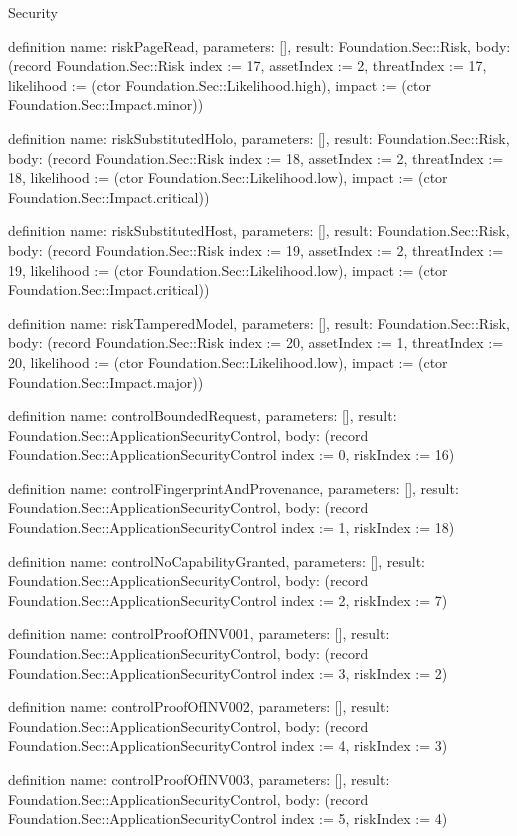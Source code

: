 \begin{lexlean}{Security}
\begin{semanticmodule}
definition{
  name: riskPageRead,
  parameters: [],
  result: Foundation.Sec::Risk,
  body: (record Foundation.Sec::Risk {index := 17, assetIndex := 2, threatIndex := 17, likelihood := (ctor Foundation.Sec::Likelihood.high), impact := (ctor Foundation.Sec::Impact.minor)})
}

definition{
  name: riskSubstitutedHolo,
  parameters: [],
  result: Foundation.Sec::Risk,
  body: (record Foundation.Sec::Risk {index := 18, assetIndex := 2, threatIndex := 18, likelihood := (ctor Foundation.Sec::Likelihood.low), impact := (ctor Foundation.Sec::Impact.critical)})
}

definition{
  name: riskSubstitutedHost,
  parameters: [],
  result: Foundation.Sec::Risk,
  body: (record Foundation.Sec::Risk {index := 19, assetIndex := 2, threatIndex := 19, likelihood := (ctor Foundation.Sec::Likelihood.low), impact := (ctor Foundation.Sec::Impact.critical)})
}

definition{
  name: riskTamperedModel,
  parameters: [],
  result: Foundation.Sec::Risk,
  body: (record Foundation.Sec::Risk {index := 20, assetIndex := 1, threatIndex := 20, likelihood := (ctor Foundation.Sec::Likelihood.low), impact := (ctor Foundation.Sec::Impact.major)})
}

definition{
  name: controlBoundedRequest,
  parameters: [],
  result: Foundation.Sec::ApplicationSecurityControl,
  body: (record Foundation.Sec::ApplicationSecurityControl {index := 0, riskIndex := 16})
}

definition{
  name: controlFingerprintAndProvenance,
  parameters: [],
  result: Foundation.Sec::ApplicationSecurityControl,
  body: (record Foundation.Sec::ApplicationSecurityControl {index := 1, riskIndex := 18})
}

definition{
  name: controlNoCapabilityGranted,
  parameters: [],
  result: Foundation.Sec::ApplicationSecurityControl,
  body: (record Foundation.Sec::ApplicationSecurityControl {index := 2, riskIndex := 7})
}

definition{
  name: controlProofOfINV001,
  parameters: [],
  result: Foundation.Sec::ApplicationSecurityControl,
  body: (record Foundation.Sec::ApplicationSecurityControl {index := 3, riskIndex := 2})
}

definition{
  name: controlProofOfINV002,
  parameters: [],
  result: Foundation.Sec::ApplicationSecurityControl,
  body: (record Foundation.Sec::ApplicationSecurityControl {index := 4, riskIndex := 3})
}

definition{
  name: controlProofOfINV003,
  parameters: [],
  result: Foundation.Sec::ApplicationSecurityControl,
  body: (record Foundation.Sec::ApplicationSecurityControl {index := 5, riskIndex := 4})
}


\end{semanticmodule}
\end{lexlean}
